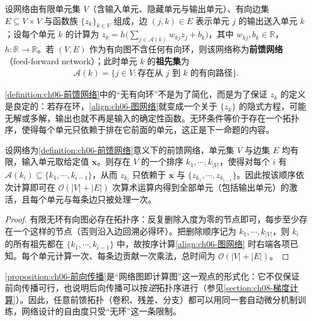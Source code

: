 \documentclass[../../main.tex]{subfiles}
\begin{document}
\begin{definition}[前馈网络]\label{definition:ch06-前馈网络}
设网络由有限单元集 $V$（含输入单元、隐藏单元与输出单元）、有向边集 $E\subseteq V\times V$ 与函数族 $\{z_{k}\}_{k\in V}$ 组成，边 $(j,k)\in E$ 表示单元 $j$ 的输出送入单元 $k$；设每个单元 $k$ 的计算为 $z_{k}=h\bigl(\sum_{j\in\mathcal{A}(k)}w_{kj}z_{j}+b_{k}\bigr)$，其中 $w_{kj},b_{k}\in\mathbb{R}$，$h:\mathbb{R}\to\mathbb{R}$。若 $(V,E)$ 作为有向图不含任何有向环，则该网络称为\textbf{前馈网络}（feed-forward network）；此时单元 $k$ 的\textbf{祖先集}为
\begin{align}
\mathcal{A}(k)=\bigl\{j\in V:\text{存在从 }j\text{ 到 }k\text{ 的有向路径}\bigr\}.
\label{align:ch06-祖先集}
\end{align}
\end{definition}

\begin{remark}\cref{definition:ch06-前馈网络}中的“无有向环”不是为了简化，而是为了保证 $z_k$ 的定义是良定的：若存在环，\eqref{align:ch06-图网络}就变成一个关于 $\{z_k\}$ 的隐式方程，可能无解或多解，输出也就不再是输入的确定性函数。无环条件等价于存在一个拓扑序，使得每个单元只依赖于排在它前面的单元，这正是下一命题的内容。
\end{remark}

\begin{proposition}[前向传播的可计算性]\label{proposition:ch06-前向传播}
设网络为\cref{definition:ch06-前馈网络}意义下的前馈网络，单元集 $V$ 与边集 $E$ 均有限，输入单元取给定值 $\boldsymbol{x}$。则存在 $V$ 的一个排序 $k_{1},\cdots,k_{|V|}$，使得对每个 $i$ 有 $\mathcal{A}(k_{i})\subseteq\{k_{1},\cdots,k_{i-1}\}$，从而 $z_{k_{i}}$ 只依赖于 $\boldsymbol{x}$ 与 $\{z_{k_{1}},\cdots,z_{k_{i-1}}\}$。因此按该顺序依次计算即可在 $\mathcal{O}(|V|+|E|)$ 次算术运算内得到全部单元（包括输出单元）的激活，且每个单元与每条边只被处理一次。
\end{proposition}

\begin{proof}
有限无环有向图必存在拓扑序：反复删除入度为零的节点即可，每步至少存在一个这样的节点（否则沿入边回溯必得环）。把删除顺序记为 $k_1,\cdots,k_{|V|}$，则 $k_i$ 的所有祖先都在 $\{k_1,\cdots,k_{i-1}\}$ 中，故按序计算\eqref{align:ch06-图网络} 时右端各项已知。每个单元计算一次、每条边贡献一次乘法，总时间为 $\mathcal{O}(|V|+|E|)$。
\end{proof}

\begin{remark}\cref{proposition:ch06-前向传播}是“网络图即计算图”这一观点的形式化：它不仅保证前向传播可行，也说明后向传播可以按\emph{逆}拓扑序进行（参见\cref{section:ch08-梯度计算}）。因此，任意前馈拓扑（卷积、残差、分支）都可以用同一套自动微分机制训练，网络设计的自由度只受“无环”这一条限制。
\end{remark}
\end{document}
